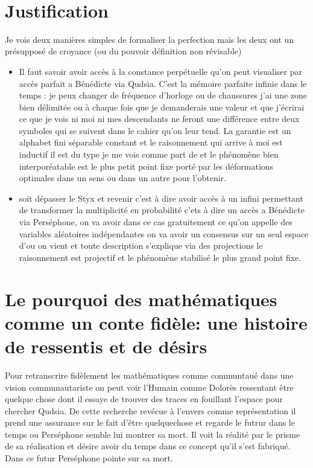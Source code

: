 \documentclass{article}
\begin{document}
\

\section{Justification}
Je vois deux manières simples de formaliser la perfection mais les deux ont un présupposé de croyance (ou du pouvoir  définition non révisable)
\begin{itemize} 
\item Il faut savoir avoir accès à la constance perpétuelle qu'on peut visualiser par accès parfait a Bénédicte via Qudsia. C'est la mémoire  parfaite infinie dans le temps : je peux changer de fréquence d'horloge ou de chaussures j'ai une zone bien délimitée ou à chaque fois que je demanderais une valeur et que j'écrirai ce que je vois ni moi ni mes descendants ne feront une différence entre deux symboles qui se suivent dans le cahier qu'on leur tend. La garantie est un alphabet fini  séparable constant et le raisonnement qui arrive à moi est inductif il est du type je me vois comme part de et le phénomène bien interporéatable est le plus petit point fixe porté par les déformations optimales dans un sens ou dans un autre pour l'obtenir.
\item  soit dépasser le Styx et revenir c'est à dire avoir accès à un infini permettant de transformer la multiplicité en probabilité c'ets à dire un accès a Bénédicte via Perséphone, on va avoir dans ce cas gratuitement ce qu'on appelle des variables aléatoires indépendantes on va avoir un consensus sur un seul espace d'ou on vient et toute description s'explique via des projections le raisonnement est projectif et le phénomène stabilisé le plus grand point fixe.
\end{itemize}




 

\section{Le pourquoi des mathématiques comme un conte fidèle:  une histoire de ressentis et de désirs}
Pour retranscrire fidèlement les mathématiques comme communtaué dans une vision communautariste
on peut voir l'Humain comme Dolorès ressentant être quelque chose dont il essaye de trouver des traces en fouillant l'espace pour chercher Qudsia.
De cette recherche revécue à l'envers  comme représentation il prend une  assurance   sur le fait d'être quelquechose et regarde le futrur dans le temps ou Perséphone semble lui montrer sa mort. Il voit la réalité par le prisme de sa réalisation et désire avoir du temps dans ce concept qu'il s'est fabriqué. Dans ce futur Perséphone pointe sur sa mort.
\end{document}
